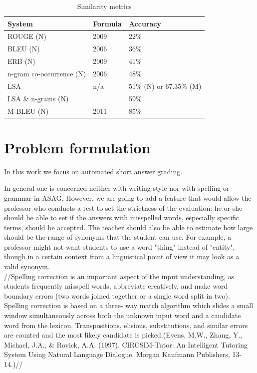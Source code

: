 \documentclass[11pt]{report}
\numberwithin{equation}{section} %
\begin{document}
\begin{table}[h!]
\centering
\caption{Similarity metrics}
\label{sim}
\begin{tabular}{|l|l|l|}
\hline
 System & Formula & Accuracy \\ \hline
 ROUGE (N)& 2009 & 22\%  \\ \hline
 BLEU (N)& 2006 & 36\% \\ \hline
 ERB (N)& 2009 & 41\%  \\ \hline
 n-gram co-occurrence (N)& 2006 & 48\% \\ \hline
 LSA & n/a & 51\% (N) or 67.35\% (M) \\ \hline
 LSA \& n-grams (N)&  & 59\%  \\ \hline
 M-BLEU (N)& 2011 & 85\% \\ \hline
\end{tabular}
\end{table}


\chapter{\textbf{Problem formulation}}
In this work we focus on automated short answer grading. 

In general one is concerned neither with writing style nor with spelling or grammar in ASAG. However, we are going to add a feature that would allow the professor who conducts a test to set the strictness of the evaluation: he or she should be able to set if the answers with misspelled words, especially specific terms, should be accepted. The teacher should also be able to estimate how large should be the range of synonyms that the student can use. For example, a professor might not want students to use a word "thing" instead of "entity", though in a certain context from a linguistical point of view it may look as a valid synonym.\\


//Spelling correction is an important aspect of the input
understanding, as students frequently misspell words,
abbreviate creatively, and make word boundary
errors (two words joined together or a single word
split in two). Spelling correction is based on a three-
way match algorithm which slides a small window
simultaneously across both the unknown input word
and a candidate word from the lexicon.
Transpositions, elisions, substitutions, and similar
errors are counted and the most likely candidate is
picked.(Evens, M.W., Zhang, Y., Michael, J.A., \& Rovick, A.A.
(1997). CIRCSIM-Tutor: An Intelligent Tutoring System
Using Natural Language Dialogue. Morgan Kaufmann
Publishers, 13-14.)// 
\end{document}
